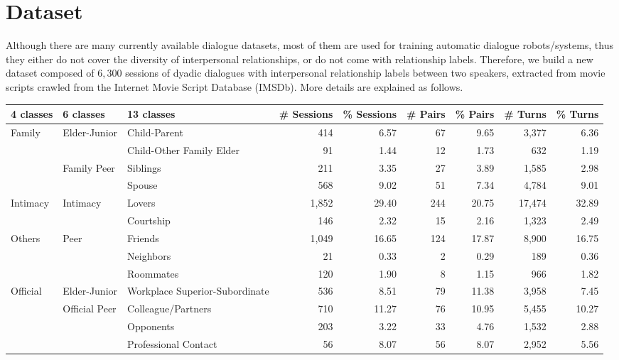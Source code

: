 \section{Dataset}
\label{sec:dataset}
Although there are many currently available dialogue datasets, 
most of them are used for training automatic dialogue robots/systems, 
thus they either do not cover the diversity of interpersonal relationships, 
or do not come with relationship labels.
Therefore, we build a new dataset 
composed of $6,300$ sessions of dyadic dialogues with 
interpersonal relationship labels between two speakers, 
extracted from movie scripts crawled from 
the Internet Movie Script Database (IMSDb). More details are explained as follows. %

\begin{table*}[t]
	\centering
	\small
	\begin{tabular}{@{}lllrrrrrr@{}}
		\toprule[1.5pt]
		\textbf{4 classes} & \textbf{6 classes} & \textbf{13 classes}  & \textbf{\# Sessions} & \textbf{\% Sessions}& \textbf{\# Pairs} & \textbf{\% Pairs} & \textbf{\# Turns} & \textbf{\% Turns}  \\ 
		\hline
		\multirow{4}{*}{Family}&\multirow{2}{*}{Elder-Junior} & Child-Parent   &  414    &   6.57   &  67   &	9.65	&  3,377 & 6.36   \\
		& & Child-Other Family Elder 															    &   91   &  1.44    &  12   &	1.73	&   632  & 1.19  \\
		& \multirow{2}{*}{Family Peer} & Siblings 														  &   211   &   3.35   &  27   &   3.89	&   1,585  & 2.98 \\
		& & Spouse 																						   &   568   &   9.02   &  51   &	 7.34  &   4,784  & 9.01 \\
		\hline
		\multirow{2}{*}{Intimacy}& \multirow{2}{*}{Intimacy} &  Lovers					&  1,852    &  29.40    &  244   &20.75	&   17,474 & 32.89  \\
		& & Courtship	
		&  146    &   2.32   &  15   & 2.16	&  1,323 & 2.49   \\
		\hline
		\multirow{3}{*}{Others}& \multirow{3}{*}{Peer} & Friends 					&  1,049    & 16.65     &  124   &17.87	&  8,900 & 16.75    \\
		& &Neighbors 																					 &   21   &  0.33    &  2   &	0.29& 189 & 0.36      \\
		& &Roommates 																				    &  120    &   1.90   &  8   & 1.15	&   966 & 1.82   \\
		
		
		\hline
		\multirow{4}{*}{Official}& \multirow{1}{*}{Elder-Junior} &Workplace Superior-Subordinate &  536    &   8.51   &  79   &	11.38& 3,958 & 7.45     \\
		&\multirow{3}{*}{Official Peer} &Colleague/Partners										&   710   &  11.27    &  76   &	10.95 & 5,455 & 10.27     \\
		& &Opponents																				  &  203   &  3.22    &  33   &  4.76	&  1,532 & 2.88   \\
		& &Professional Contact																	  &   56   &  8.07    &  56   &	8.07 & 2,952 & 5.56     \\
		

\end{tabular}
\end{table*}
